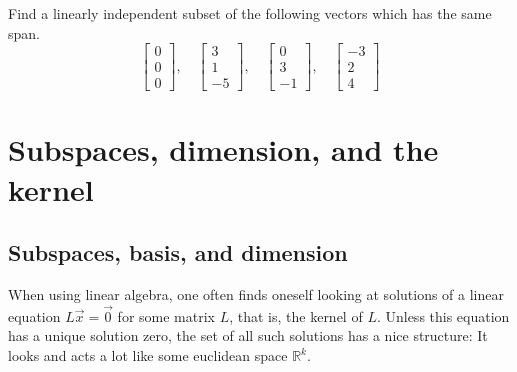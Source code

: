 \begin{exercise}
Find a linearly independent subset of the following vectors which has
the same span.
\begin{equation*}
\begin{bmatrix}
0 \\ 0 \\ 0
\end{bmatrix}
, \quad
\begin{bmatrix}
3 \\ 1 \\ -5
\end{bmatrix}
, \quad
\begin{bmatrix}
0 \\ 3 \\ -1
\end{bmatrix}
, \quad
\begin{bmatrix}
-3 \\ 2 \\ 4
\end{bmatrix}
\end{equation*}
\end{exercise}




\sectionnewpage
\section{Subspaces, dimension, and the kernel}
\label{subspaces:section}


\subsection{Subspaces, basis, and dimension}

When using linear algebra, one often finds oneself looking at
solutions of a linear equation $L\vec{x} = \vec{0}$ for some matrix $L$,
that is, the kernel of $L$.
Unless this equation has a unique solution zero,
the set of all such solutions has a nice structure:  It looks and
acts a lot like some euclidean space ${\mathbb R}^k$.

